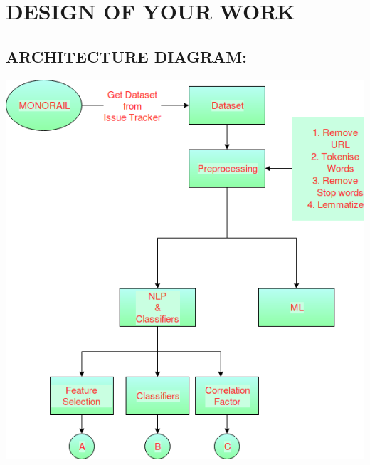 
\chapter{\uppercase{Design of your work}} %
\label{ch:chap3} %
\section{\uppercase{Architecture Diagram:}}
\includegraphics[scale=0.5]{ARCHITECT.png} 